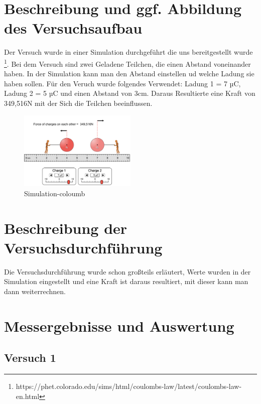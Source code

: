 \documentclass[a4paper]{article}
\begin{document}
\section{Beschreibung und ggf. Abbildung des Versuchsaufbau} %
\label{ssub:Beschreibung und ggf. Abbildung des Versuchsaufbau}
Der Versuch wurde in einer Simulation durchgeführt die uns bereitgestellt
wurde \footnote{https://phet.colorado.edu/sims/html/coulombs-law/latest/coulombs-law-en.html}.
Bei dem Versuch sind zwei Geladene Teilchen, die einen Abstand voneinander
haben. In der Simulation kann man den Abstand einstellen ud welche Ladung sie haben sollen.
Für den Veruch wurde folgendes Verwendet: Ladung 1 = 7 µC, Ladung 2 = 5 µC und einen Abstand von 3cm.
Daraus Resultierte eine Kraft von 349,516N mit der Sich die Teilchen beeinflussen.

\begin{figure}[htpb]
  \begin{center}
    \includegraphics[width=0.5\textwidth]{simu-1.png}
  \end{center}
  \caption{Simulation-coloumb}
  \label{fig:simulation}
\end{figure}


\section{Beschreibung der Versuchsdurchführung} %
\label{ssub:Beschreibung der Versuchsdurchführung}
Die Versuchsdurchführung wurde schon großteils erläutert, Werte wurden in der
Simulation eingestellt und eine Kraft ist daraus resultiert, mit dieser kann
man dann weiterrechnen.

\section{Messergebnisse und Auswertung}
\subsection{Versuch 1}
\end{document}
